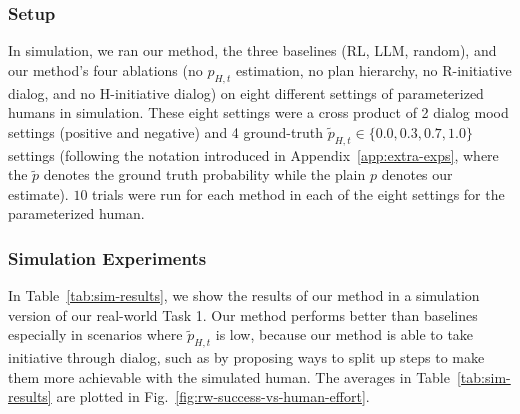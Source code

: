 \subsubsection{Setup}
In simulation, we ran our method, the three baselines (RL, LLM, random), and our method's four ablations (no $p_{H, t}$ estimation, no plan hierarchy, no R-initiative dialog, and no H-initiative dialog) on eight different settings of parameterized humans in simulation. These eight settings were a cross product of 2 dialog mood settings (positive and negative) and 4 ground-truth $\tilde{p}_{H, t} \in \{0.0, 0.3, 0.7, 1.0\}$ settings (following the notation introduced in Appendix~\ref{app:extra-exps}, where the $\tilde{p}$ denotes the ground truth probability while the plain $p$ denotes our estimate). $10$ trials were run for each method in each of the eight settings for the parameterized human.

\subsubsection{Simulation Experiments}

In Table~\ref{tab:sim-results}, we show the results of our method in a simulation version of our real-world Task 1. Our method performs better than baselines especially in scenarios where $\tilde{p}_{H, t}$ is low, because our method is able to take initiative through dialog, such as by proposing ways to split up steps to make them more achievable with the simulated human. The averages in Table~\ref{tab:sim-results} are plotted in Fig.~\ref{fig:rw-success-vs-human-effort}.

